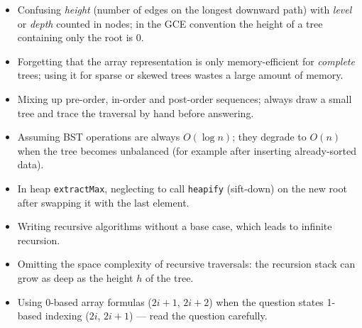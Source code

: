 \documentclass[11pt]{article}
\begin{document}
\begin{attention}
\begin{itemize}
\item Confusing \emph{height} (number of edges on the longest downward path) with \emph{level} or \emph{depth} counted in nodes; in the GCE convention the height of a tree containing only the root is $0$.
\item Forgetting that the array representation is only memory-efficient for \emph{complete} trees; using it for sparse or skewed trees wastes a large amount of memory.
\item Mixing up pre-order, in-order and post-order sequences; always draw a small tree and trace the traversal by hand before answering.
\item Assuming BST operations are always $O(\log n)$; they degrade to $O(n)$ when the tree becomes unbalanced (for example after inserting already-sorted data).
\item In heap \texttt{extractMax}, neglecting to call \texttt{heapify} (sift-down) on the new root after swapping it with the last element.
\item Writing recursive algorithms without a base case, which leads to infinite recursion.
\item Omitting the space complexity of recursive traversals: the recursion stack can grow as deep as the height $h$ of the tree.
\item Using 0-based array formulas ($2i+1$, $2i+2$) when the question states 1-based indexing ($2i$, $2i+1$) — read the question carefully.
\end{itemize}
\end{attention}
\end{document}
